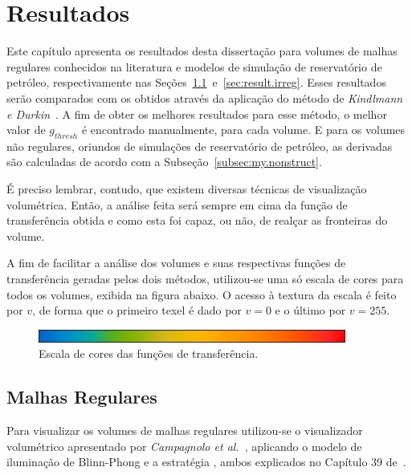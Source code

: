 
\chapter{Resultados}
\label{ch:result}

	Este capítulo apresenta os resultados desta dissertação para volumes de malhas regulares conhecidos na literatura e modelos de simulação de reservatório de petróleo, respectivamente nas Seções~\ref{sec:result.reg}~e~\ref{sec:result.irreg}. Esses resultados serão comparados com os obtidos através da aplicação do método de \textit{Kindlmann e Durkin}~\cite{gordon}. A fim de obter os melhores resultados para esse método, o melhor valor de $ g_{thresh} $ é encontrado manualmente, para cada volume. E para os volumes não regulares, oriundos de simulações de reservatório de petróleo, as derivadas são calculadas de acordo com a Subseção~\ref{subsec:my.nonstruct}.
	
	É preciso lembrar, contudo, que existem diversas técnicas de visualização volumétrica. Então, a análise feita será sempre em cima da função de transferência obtida e como esta foi capaz, ou não, de realçar as fronteiras do volume.
	
	A fim de facilitar a análise dos volumes e suas respectivas funções de transferência geradas pelos dois métodos, utilizou-se uma só escala de cores para todos os volumes, exibida na figura abaixo. O acesso à textura da escala é feito por $ v $, de forma que o primeiro texel é dado por $ v = 0 $ e o último por $ v = 255 $.

\begin{figure}[h]
	\centering
	\includegraphics[width=0.9\textwidth]{images/r_colorscale}
	\caption{Escala de cores das funções de transferência.}
\end{figure}

\section{Malhas Regulares}
\label{sec:result.reg}

	Para visualizar os volumes de malhas regulares utilizou-se o visualizador volumétrico apresentado por \textit{Campagnolo et al.}~\cite{lqc}, aplicando o modelo de iluminação de Blinn-Phong e a estratégia , ambos explicados no Capítulo 39 de~\cite{gems}.

